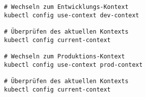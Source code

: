 \begin{verbatim}
# Wechseln zum Entwicklungs-Kontext
kubectl config use-context dev-context

# Überprüfen des aktuellen Kontexts
kubectl config current-context

# Wechseln zum Produktions-Kontext
kubectl config use-context prod-context

# Überprüfen des aktuellen Kontexts
kubectl config current-context
\end{verbatim}